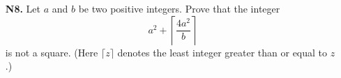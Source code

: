 \documentclass[11pt,a4paper]{article}
\begin{document}
\begin{enumerate}

	
	\item[\textbf{N8.}] Let $a$ and $b$ be two positive integers. Prove that the integer
	\[a^2+\left\lceil\frac{4a^2}b\right\rceil\]is not a square. (Here $\lceil z\rceil$ denotes the least integer greater than or equal to $z$.)
	
\end{enumerate}



\newpage
\end{document}
